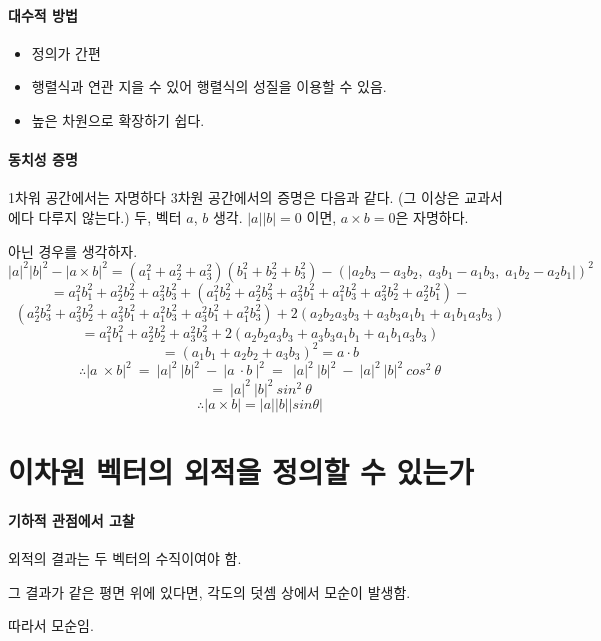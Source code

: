 \paragraph{대수적 방법}
\begin{itemize}
    \item 정의가 간편
    \item 행렬식과 연관 지을 수 있어 행렬식의 성질을 이용할 수 있음.
    \item 높은 차원으로 확장하기 쉽다.
\end{itemize}


\paragraph{동치성 증명}


	1차워 공간에서는 자명하다
	3차원 공간에서의 증명은 다음과 같다. (그 이상은 교과서에다 다루지 않는다.)
	두, 벡터 $a$, $b$ 생각.
	$\left|a\right|\left|b\right|=0$ 이면, $a \times b =0$은 자명하다.
	
	아닌 경우를 생각하자.
	$$\left|a\right|^2\left|b\right|^2-\left|a\times b\right|^2=\left(a_1^2+a_2^2+a_3^2\right)\left(b_1^2+b_2^2+b_3^2\right)-\left(|a_2b_3-a_3b_2,\;a_3b_1-a_1b_3,\;a_1b_2-a_2b_1|\right)^2$$
	$$= a_1^2b_1^2+a_2^2b_2^2+a_3^2b_3^2+\left(a_1^2b_2^2+a_2^2b_3^2+a_3^2b_1^2+a_1^2b_3^2+a_3^2b_2^2+a_2^2b_1^2\right)-$$$$  \left(a_2^2b_3^2+a_3^2b_2^2+a_3^2b_1^2+a_1^2b_3^2+a_3^2b_1^2+a_1^2b_3^2\right)+2\left(a_2b_2a_3b_3+a_3b_3a_1b_1+a_1b_1a_3b_3\right)$$
	$$=a_1^2b_1^2+a_2^2b_2^2+a_3^2b_3^2+2\left(a_2b_2a_3b_3+a_3b_3a_1b_1+a_1b_1a_3b_3\right)$$
	$$= \left(a_1b_1+a_2b_2+a_3b_3\right)^2=a\cdot b$$
	$$\therefore |a\ \times b|^2\ =\ |a|^2\ |b|^2\ -\ |a\ \cdot b\ |^2\ =\ \ |a|^2\ |b|^2\ -\ |a|^2\ |b|^2\ cos^2\ \theta$$
	$$=\ |a|^2\ |b|^2\ sin^2\ \theta$$
	$$\therefore\left|a\times b\left|=\left|a\right|\right|b\right|\left|sin\theta\right|$$

\section{이차원 벡터의 외적을 정의할 수 있는가}

\paragraph{기하적 관점에서 고찰}


외적의 결과는 두 벡터의 수직이여야 함.

그 결과가 같은 평면 위에 있다면, 각도의 덧셈 상에서 모순이 발생함.

따라서 모순임.

    